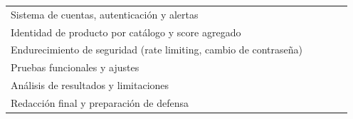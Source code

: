 \begin{table}[ht]
\begin{tabularx}{\textwidth}{@{}X c c c c@{}}
		Sistema de cuentas, autenticación y alertas            &         &         & \avance &         \\
		Identidad de producto por catálogo y score agregado    &         &         & \avance &         \\
		Endurecimiento de seguridad (rate limiting, cambio de contraseña) &  &        & \avance &         \\
		Pruebas funcionales y ajustes                         & \avance & \avance & \avance &         \\
		Análisis de resultados y limitaciones                 &         &         & \avance &         \\
		Redacción final y preparación de defensa               &         &         &         &         \\
		\bottomrule
	\end{tabularx}
\end{table}